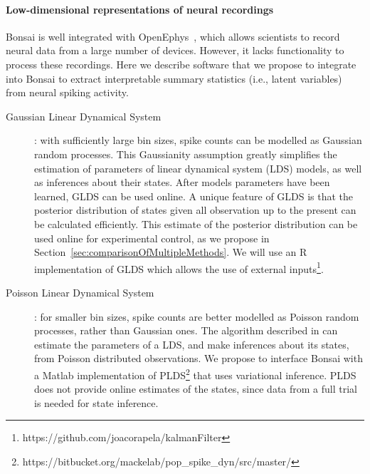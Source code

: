 \paragraph{Low-dimensional representations of neural recordings}
\label{sec:lowDimensionalRepresentation}

Bonsai is well integrated with OpenEphys~\citep{siegleEtAl17}, which allows
scientists to record neural data from a large number of devices. However, it
lacks functionality to process these recordings. Here we describe software that
we propose to integrate into Bonsai to extract interpretable summary statistics
(i.e., latent variables) from neural spiking activity.

\begin{description}

    \item[Gaussian Linear Dynamical
        System]\citep[GLDS;][]{andersonAndMoore12}: with sufficiently large
        bin sizes, spike counts can be modelled as Gaussian random processes.
        This Gaussianity assumption greatly simplifies the estimation of
        parameters of linear dynamical system (LDS) models, as well as
        inferences about their states. After models parameters have been
        learned, GLDS can be used online. A unique feature of GLDS is that the
        posterior distribution of states given all observation up to the
        present can be calculated efficiently. This estimate of the posterior
        distribution can be used online for experimental control, as we
        propose in Section~\ref{sec:comparisonOfMultipleMethods}. We will use an R implementation of GLDS
        which allows the use of external
        inputs\footnote{https://github.com/joacorapela/kalmanFilter}.

    \item[Poisson Linear Dynamical System]\citep[PLDS;][]{mackeEtAl15}: for
        smaller bin sizes, spike counts are better modelled as Poisson random
        processes, rather than Gaussian ones. The algorithm described in
        \citet{mackeEtAl15} can estimate the parameters of a LDS, and make
        inferences about its states, from Poisson distributed observations.  We
        propose to interface Bonsai with a Matlab implementation of
        PLDS\footnote{https://bitbucket.org/mackelab/pop\_spike\_dyn/src/master/}
        that uses variational inference. PLDS does not provide online estimates
        of the states, since data from a full trial is needed for state
        inference.


\end{description}
